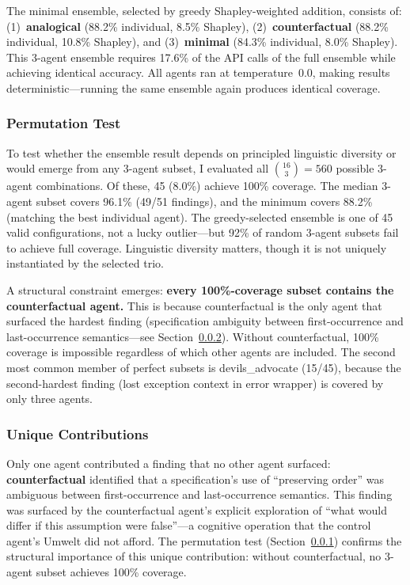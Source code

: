 \documentclass[11pt,a4paper]{article}
\begin{document}
The minimal ensemble, selected by greedy Shapley-weighted addition, consists of: (1)~\textbf{analogical} (88.2\% individual, 8.5\% Shapley), (2)~\textbf{counterfactual} (88.2\% individual, 10.8\% Shapley), and (3)~\textbf{minimal} (84.3\% individual, 8.0\% Shapley). This 3-agent ensemble requires 17.6\% of the API calls of the full ensemble while achieving identical accuracy. All agents ran at temperature~0.0, making results deterministic---running the same ensemble again produces identical coverage.

\subsubsection{Permutation Test}
\label{sec:permutation}

To test whether the ensemble result depends on principled linguistic diversity or would emerge from any 3-agent subset, I evaluated all $\binom{16}{3} = 560$ possible 3-agent combinations. Of these, 45 (8.0\%) achieve 100\% coverage. The median 3-agent subset covers 96.1\% (49/51 findings), and the minimum covers 88.2\% (matching the best individual agent). The greedy-selected ensemble is one of 45 valid configurations, not a lucky outlier---but 92\% of random 3-agent subsets fail to achieve full coverage. Linguistic diversity matters, though it is not uniquely instantiated by the selected trio.

A structural constraint emerges: \textbf{every 100\%-coverage subset contains the counterfactual agent.} This is because counterfactual is the only agent that surfaced the hardest finding (specification ambiguity between first-occurrence and last-occurrence semantics---see Section~\ref{sec:unique}). Without counterfactual, 100\% coverage is impossible regardless of which other agents are included. The second most common member of perfect subsets is devils\_advocate (15/45), because the second-hardest finding (lost exception context in error wrapper) is covered by only three agents.

\subsubsection{Unique Contributions}
\label{sec:unique}

Only one agent contributed a finding that no other agent surfaced: \textbf{counterfactual} identified that a specification's use of ``preserving order'' was ambiguous between first-occurrence and last-occurrence semantics. This finding was surfaced by the counterfactual agent's explicit exploration of ``what would differ if this assumption were false''---a cognitive operation that the control agent's Umwelt did not afford. The permutation test (Section~\ref{sec:permutation}) confirms the structural importance of this unique contribution: without counterfactual, no 3-agent subset achieves 100\% coverage.
\end{document}
